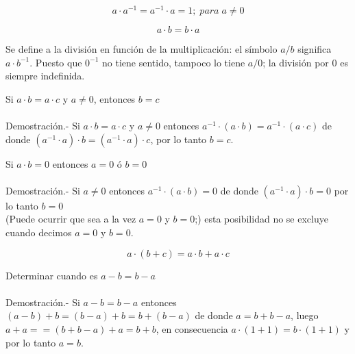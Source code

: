 \begin{prop}
$$a\cdot a^{-1} = a^{-1} \cdot a = 1; \; para \; a\neq 0$$
\end{prop}

\begin{prop} 
$$a\cdot b = b\cdot a$$
\end{prop}

\begin{def.}
Se define a la división en función de la multiplicación: el símbolo $a/b$ significa $a\cdot b^{-1}$. Puesto que $0^{-1}$ no tiene sentido, tampoco lo tiene $a/0$; la división por $0$ es siempre indefinida. 
\end{def.}

\begin{teo}
Si $a\cdot b = a \cdot c$ y $a\neq 0$, entonces $b=c$\\\\
Demostración.- \; Si $a\cdot b = a\cdot c$ y $a\neq 0$ entonces $a^{-1} \cdot (a \cdot b) = a^{-1} \cdot (a \cdot c)$ de donde $(a^{-1} \cdot a) \cdot b = (a^{-1} \cdot a) \cdot c$, por lo tanto $b=c.$
\end{teo}

\begin{teo}
Si $a\cdot b =0$ entonces $a=0$ ó $b=0$\\\\
Demostración.- \; Si $a\neq 0$ entonces $a^{-1} \cdot (a\cdot b) = 0$ de donde  $(a^{-1} \cdot a) \cdot b =0$ por lo tanto $b=0$\\
(Puede ocurrir que sea a la vez $a=0$ y $b=0$;) esta posibilidad no se excluye cuando decimos $a=0$ y $b=0$. 
\end{teo}



\begin{prop}
$$a\cdot (b+c) = a \cdot b + a \cdot c$$
\end{prop}

\begin{teo}
Determinar cuando es $a-b=b-a$\\\\
Demostración.- \; Si $a-b=b-a$ entonces $(a-b) + b = (b-a) + b = b+ (b-a)$ de donde $a=b+b-a$, luego $a+a = =(b+b-a)+a=b+b$, en consecuencia $a\cdot (1+1)=b\cdot (1+1)$ y por lo tanto $a=b$.
\end{teo}

